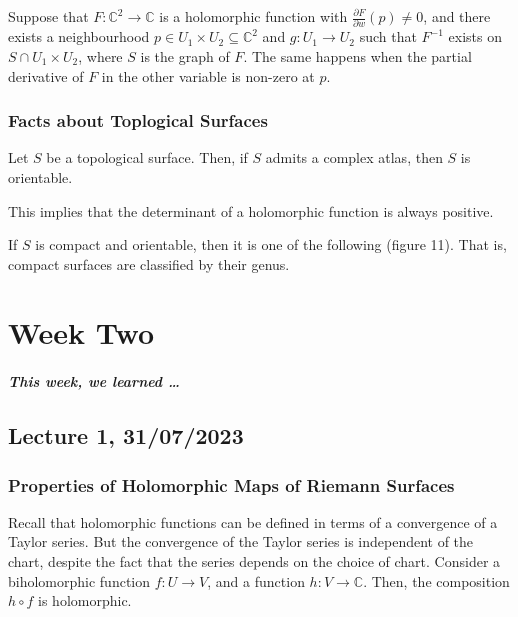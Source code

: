 \documentclass[a4paper]{report}
\theoremstyle{definition}
\theoremstyle{remark}
\theoremstyle{proposition}
\theoremstyle{conjecture}
\theoremstyle{lemma}
\theoremstyle{corollary}
\theoremstyle{exercise}
\theoremstyle{example}
\newcommand{\C}{\mathbb{C}}
\begin{document}
\begin{theorem}
    Suppose that $F : \C^2 \to \C$ is a holomorphic function with 
    $\frac{\partial F}{\partial w}(p) \neq 0$, and there 
    exists a neighbourhood $p \in U_1\times U_2 \subseteq\C^2$ and 
    $g : U_1\to U_2$ such that $F^{-1}$ exists on $S\cap U_1\times U_2$,
    where $S$ is the graph of $F$. The same happens when the partial 
    derivative of $F$ in the other variable is non-zero at $p$.
\end{theorem}

\subsection{Facts about Toplogical Surfaces}

\begin{theorem}
    Let $S$ be a topological surface. Then, if $S$ admits a complex atlas,
    then $S$ is orientable.
\end{theorem}

This implies that the determinant of a holomorphic function is always positive.

\begin{theorem}
    If $S$ is compact and orientable, then it is one of the following (figure 11).
    That is, compact surfaces are classified by their genus.
\end{theorem}



\chapter{Week Two}

\paragraph{This week, we learned \ldots}

\section{Lecture 1, 31/07/2023}

\subsection{Properties of Holomorphic Maps of Riemann Surfaces}

Recall that holomorphic functions can be defined in terms of a convergence 
of a Taylor series. 
But the convergence of the Taylor series is independent of the chart, despite
 the fact that the series depends on the choice of chart. 
 Consider a biholomorphic function $f : U\to V$, and a function $h : V \to \C$.
 Then, the composition $h\circ f$ is holomorphic.
\end{document}
